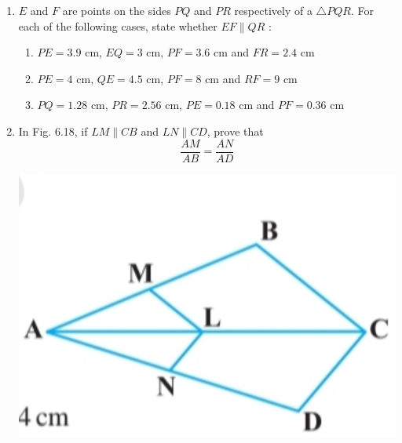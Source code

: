 \documentclass[a4paper,12pt]{article}
\begin{document}
\begin{enumerate}
\vspace{-2em}

\item $E$ and $F$ are points on the sides $PQ$ and $PR$ respectively of a $\triangle PQR$. For each of the following cases, state whether $EF \parallel QR$ :

\begin{enumerate}[label=(\roman*)]
    \item $PE = 3.9$ cm, $EQ = 3$ cm, $PF = 3.6$ cm and $FR = 2.4$ cm  
    \item $PE = 4$ cm, $QE = 4.5$ cm, $PF = 8$ cm and $RF = 9$ cm  
    \item $PQ = 1.28$ cm, $PR = 2.56$ cm, $PE = 0.18$ cm and $PF = 0.36$ cm  
\end{enumerate}

\vspace{1em}

\item 
\vspace{-8em}\begin{minipage}[t]{0.6\textwidth}
In Fig. 6.18, if $LM \parallel CB$ and $LN \parallel CD$, prove that  
$$
\frac{AM}{AB} = \frac{AN}{AD}
$$
\end{minipage}%
\hfill
\begin{minipage}[t]{0.35\textwidth}
\includegraphics[width=\linewidth]{a2.jpg}
\end{minipage}

\vspace{1em}


\end{enumerate}
\end{document}
